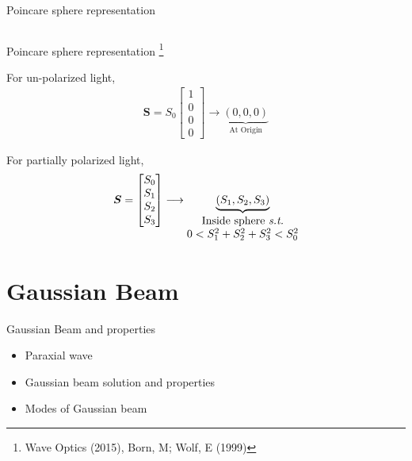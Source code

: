 \documentclass[12pt, dvipsnames]{beamer}
\numberwithin{equation}{section}
\newcommand\blfootnote[1]{%
	\begingroup
	\renewcommand\thefootnote{}\footnote{#1}%
	\addtocounter{footnote}{-1}%
	\endgroup
}
\begin{document}
\begin{frame}[t]{Poincare sphere representation}
{\begin{columns}
	\end{columns}}

\end{frame}

\begin{frame}[t]{Poincare sphere representation}\blfootnote{Wave Optics (2015), Born, M;  Wolf, E (1999)} %
For un-polarized light,
	\begin{align*}\boldsymbol{S}=
		S_0
		\begin{bmatrix}
			1\\
			0\\
			0\\
			0
		\end{bmatrix}\longrightarrow
		\underbrace{(0,0,0)}_{\text{At Origin}}
	\end{align*}\pause

For partially polarized light,
\begin{align*}\boldsymbol{S}=
	\begin{bmatrix}
		S_0\\
		S_1\\
		S_2\\
		S_3
	\end{bmatrix}\longrightarrow
	\underbrace{(S_1,S_2,S_3)}_{\begin{matrix}
			\text{Inside sphere \textit{s.t.}}\\
			0<S_1^2+S_2^2+S_3^2<S_0^2
		\end{matrix}}
\end{align*}

\end{frame}

\section{Gaussian Beam}

\begin{frame} %
	\centering
	\alert{\huge Gaussian Beam and properties}
	\begin{itemize}\Large
		\item<1>Paraxial wave
		\item<0>Gaussian beam solution and properties
		\item<0>Modes of Gaussian beam
	\end{itemize}
\end{frame}
\end{document}
